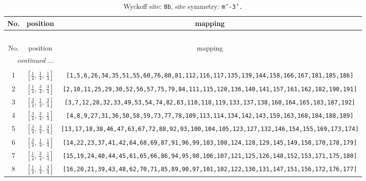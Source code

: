 \documentclass[fleqn,8pt]{jsarticle}
\begin{document}
\renewcommand{\arraystretch}{1.2}
\begin{longtable}{ccc}
\caption{Wyckoff site: {\tt 8b}, site symmetry: {\tt m'-3'.}}
 \\
 \hline \hline
No. & position & mapping \\ \hline \endfirsthead

\multicolumn{2}{l}{\tablename\ \thetable{}} \\
 \hline \hline
No. & position & mapping \\ \hline \endhead

 \hline \hline
\multicolumn{2}{r}{\footnotesize\it continued ...} \\ \endfoot

 \hline \hline
\multicolumn{2}{r}{} \\ \endlastfoot

1 & $\left[ \frac{1}{4},\, \frac{1}{4},\, \frac{1}{4} \right]$ & {\tt [1,5,6,26,34,35,51,55,60,76,80,81,112,116,117,135,139,144,158,166,167,181,185,186]} \\ \hline
2 & $\left[ \frac{1}{4},\, \frac{3}{4},\, \frac{3}{4} \right]$ & {\tt [2,10,11,25,29,30,52,56,57,75,79,84,111,115,120,136,140,141,157,161,162,182,190,191]} \\ \hline
3 & $\left[ \frac{3}{4},\, \frac{1}{4},\, \frac{3}{4} \right]$ & {\tt [3,7,12,28,32,33,49,53,54,74,82,83,110,118,119,133,137,138,160,164,165,183,187,192]} \\ \hline
4 & $\left[ \frac{3}{4},\, \frac{3}{4},\, \frac{1}{4} \right]$ & {\tt [4,8,9,27,31,36,50,58,59,73,77,78,109,113,114,134,142,143,159,163,168,184,188,189]} \\ \hline
5 & $\left[ \frac{3}{4},\, \frac{3}{4},\, \frac{3}{4} \right]$ & {\tt [13,17,18,38,46,47,63,67,72,88,92,93,100,104,105,123,127,132,146,154,155,169,173,174]} \\ \hline
6 & $\left[ \frac{3}{4},\, \frac{1}{4},\, \frac{1}{4} \right]$ & {\tt [14,22,23,37,41,42,64,68,69,87,91,96,99,103,108,124,128,129,145,149,150,170,178,179]} \\ \hline
7 & $\left[ \frac{1}{4},\, \frac{3}{4},\, \frac{1}{4} \right]$ & {\tt [15,19,24,40,44,45,61,65,66,86,94,95,98,106,107,121,125,126,148,152,153,171,175,180]} \\ \hline
8 & $\left[ \frac{1}{4},\, \frac{1}{4},\, \frac{3}{4} \right]$ & {\tt [16,20,21,39,43,48,62,70,71,85,89,90,97,101,102,122,130,131,147,151,156,172,176,177]} \\
\end{longtable}
\renewcommand{\arraystretch}{1.2}
\end{document}
